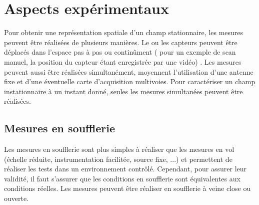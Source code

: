 










\section{Aspects expérimentaux}

Pour obtenir une représentation spatiale d'un champ stationnaire, les mesures peuvent être réalisées de plusieurs manières. Le ou les capteurs peuvent être déplacés dans l'espace pas à pas ou continûment (\cite{Comesana2013} pour un exemple de scan manuel, la position du capteur étant enregistrée par une vidéo) . Les mesures peuvent aussi être réalisées simultanément, moyennent l'utilisation d'une antenne fixe et d'une éventuelle carte d'acquisition multivoies. Pour caractériser un champ instationnaire à un instant donné, seules les mesures simultanées peuvent être réalisées.

\subsection{Mesures en soufflerie}
Les mesures en soufflerie sont plus simples à réaliser que les mesures en vol (échelle réduite, instrumentation facilitée, source fixe, ...) et permettent de réaliser les tests dans un environnement contrôlé. Cependant, pour assurer leur validité, il faut s'assurer que les conditions en soufflerie sont équivalentes aux conditions réelles. Les mesures peuvent être réaliser en soufflerie à veine close ou ouverte.
